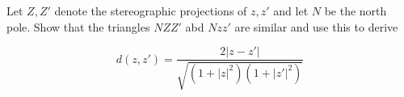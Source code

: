 Let $Z, Z'$ denote the stereographic projections of $z, z'$ and let $N$ be the north pole. Show that the
triangles $NZZ'$ abd $Nzz'$ are similar and use this to derive

$$d(z,z')=\frac{2|z-z'|}{\sqrt{(1+|z|^2)(1+|z'|^2)}}$$